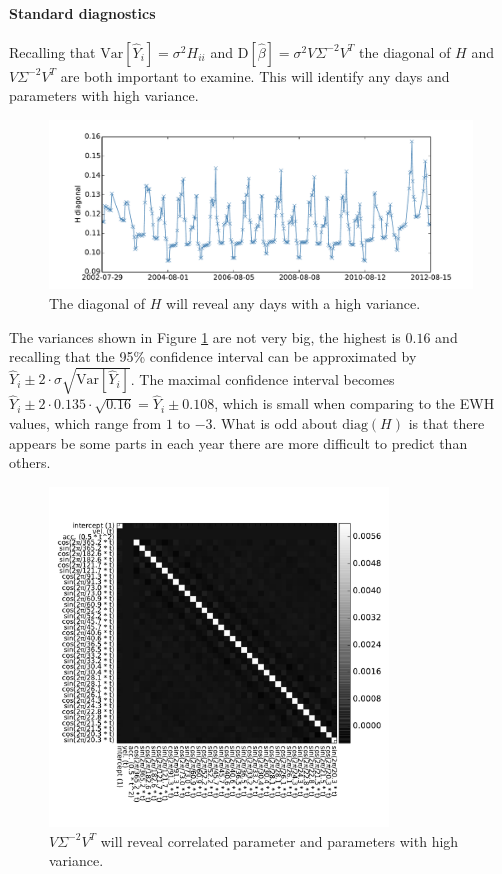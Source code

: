 \paragraph{Standard diagnostics} Recalling that $\mathrm{Var}[\hat{Y}_i] = \sigma^{2} H_{ii}$ and $\mathrm{D}[\hat{\beta}] = \sigma^{2} V \Sigma^{-2} V^T$ the diagonal of $H$ and $V \Sigma^{-2} V^T$ are both important to examine. This will identify any days and parameters with high variance.

\begin{figure}[H]
	\centering
	\includegraphics[width=\textwidth]{figures/ols-world-diagnostics-diagH}
	\caption{The diagonal of $H$ will reveal any days with a high variance.}
	\label{fig:ols-world-performance-diagH}
\end{figure}

The variances shown in Figure \ref{fig:ols-world-performance-diagH} are not very big, the highest is $0.16$ and recalling that the 95\% confidence interval can be approximated by $\hat{Y}_i \pm 2 \cdot \hat{\sigma} \sqrt{\mathrm{Var}[\hat{Y}_i]}$. The maximal confidence interval becomes $\hat{Y}_i \pm 2 \cdot 0.135 \cdot \sqrt{0.16} = \hat{Y}_i \pm 0.108$, which is small when comparing to the EWH values, which range from $1$ to $-3$. What is odd about $\mathrm{diag}(H)$ is that there appears be some parts in each year there are more difficult to predict than others. 

\begin{figure}[H]
	\centering
	\includegraphics[height=9cm]{figures/ols-world-diagnostics-cov}
	\caption{$V \Sigma^{-2} V^T$ will reveal correlated parameter and parameters with high variance.}
	\label{fig:ols-world-performance-cov}
\end{figure}

